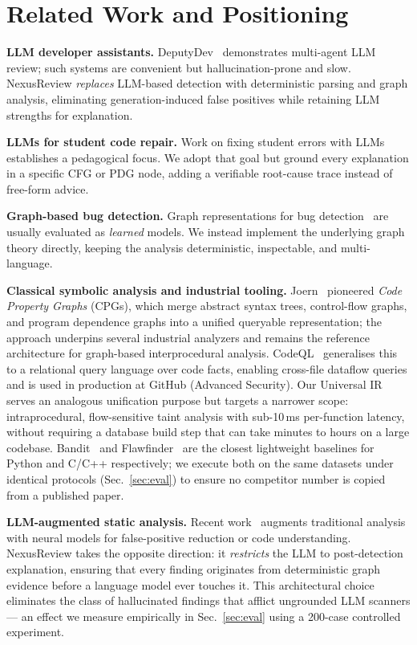 \documentclass[10pt,conference]{IEEEtran}
\begin{document}
\section{Related Work and Positioning}
\label{sec:related}

\textbf{LLM developer assistants.} DeputyDev~\cite{deputydev} demonstrates
multi-agent LLM review; such systems are convenient but hallucination-prone
and slow. NexusReview \emph{replaces} LLM-based detection with deterministic
parsing and graph analysis, eliminating generation-induced false positives
while retaining LLM strengths for explanation.

\textbf{LLMs for student code repair.} Work on fixing student errors with
LLMs~\cite{studentfix} establishes a pedagogical focus. We adopt that goal but
ground every explanation in a specific CFG or PDG node, adding a verifiable
root-cause trace instead of free-form advice.

\textbf{Graph-based bug detection.} Graph representations for bug
detection~\cite{graphbug} are usually evaluated as \emph{learned} models. We
instead implement the underlying graph theory directly, keeping the analysis
deterministic, inspectable, and multi-language.


\textbf{Classical symbolic analysis and industrial tooling.}
Joern~\cite{joern2014} pioneered {\em Code Property Graphs} (CPGs), which
merge abstract syntax trees, control-flow graphs, and program dependence graphs
into a unified queryable representation; the approach underpins several
industrial analyzers and remains the reference architecture for graph-based
interprocedural analysis. CodeQL~\cite{codeql2020} generalises this to a
relational query language over code facts, enabling cross-file dataflow queries
and is used in production at GitHub (Advanced Security). Our Universal IR
serves an analogous unification purpose but targets a narrower scope:
intraprocedural, flow-sensitive taint analysis with sub-10\,ms per-function
latency, without requiring a database build step that can take minutes to hours
on a large codebase. Bandit~\cite{bandit} and
Flawfinder~\cite{flawfinder} are the closest lightweight baselines for Python
and C/C++ respectively; we execute both on the same datasets under identical
protocols (Sec.~\ref{sec:eval}) to ensure no competitor number is copied from a
published paper.

\textbf{LLM-augmented static analysis.}
Recent work~\cite{deepseekr1}\cite{graphbug} augments traditional analysis with
neural models for false-positive reduction or code understanding.
NexusReview takes the opposite direction: it {\em restricts} the LLM to
post-detection explanation, ensuring that every finding originates from
deterministic graph evidence before a language model ever touches it.
This architectural choice eliminates the class of hallucinated findings
that afflict ungrounded LLM scanners --- an effect we measure empirically
in Sec.~\ref{sec:eval} using a 200-case controlled experiment.
\end{document}
